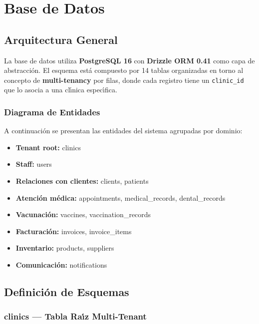 \chapter{Base de Datos}

\section{Arquitectura General}

La base de datos utiliza \textbf{PostgreSQL 16} con \textbf{Drizzle ORM 0.41}
como capa de abstracci\'on. El esquema est\'a compuesto por 14 tablas
organizadas en torno al concepto de \textbf{multi-tenancy} por filas, donde
cada registro tiene un \texttt{clinic\_id} que lo asocia a una cl\'{\i}nica
espec\'{\i}fica.

\subsection{Diagrama de Entidades}

A continuaci\'on se presentan las entidades del sistema agrupadas por dominio:

\begin{itemize}[leftmargin=*]
    \item \textbf{Tenant root:} clinics
    \item \textbf{Staff:} users
    \item \textbf{Relaciones con clientes:} clients, patients
    \item \textbf{Atenci\'on m\'edica:} appointments, medical\_records, dental\_records
    \item \textbf{Vacunaci\'on:} vaccines, vaccination\_records
    \item \textbf{Facturaci\'on:} invoices, invoice\_items
    \item \textbf{Inventario:} products, suppliers
    \item \textbf{Comunicaci\'on:} notifications
\end{itemize}

\section{Definici\'on de Esquemas}

\subsection{clinics --- Tabla Ra\'{\i}z Multi-Tenant}

